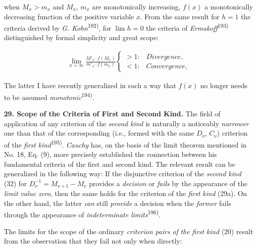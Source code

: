 \thispagestyle{fancy}

\vspace{0.5cm}

when $M_x > m_x$ and $M_x$, $m_x$ are monotonically increasing, $f(x)$ a monotonically decreasing function of the positive variable $x$. From the same result for $h = 1$ the criteria derived by \textit{G. Kohn}\textsuperscript{192)}, for $\lim h = 0$ the criteria of \textit{Ermakoff}\textsuperscript{193)} distinguished by formal simplicity and great scope:

\vspace{-0.5cm}
\begin{align}
    \lim_{x=\infty} \frac{M'_x \cdot f(M_x)}{m'_x \cdot f(m_x)} \begin{cases} > 1: & \textit{Divergence}, \\ < 1: & \textit{Convergence}, \end{cases}
\end{align}
\vspace{-0.3cm}

The latter I have recently generalized in such a way that $f(x)$ no longer needs to be assumed \textit{monotonic}\textsuperscript{194)}.

\vspace{0.2cm}
\textbf{29. Scope of the Criteria of First and Second Kind.} The field of application of any criterion of the \textit{second kind} is naturally a noticeably \textit{narrower} one than that of the corresponding (i.e., formed with the same $D_\nu$, $C_\nu$) criterion of the \textit{first kind}\textsuperscript{195)}. \textit{Cauchy} has, on the basis of the limit theorem mentioned in No. 18, Eq. (9), more precisely established the connection between his fundamental criteria of the first and second kind. The relevant result can be generalized in the following way: If the disjunctive criterion of the \textit{second kind} (32) for $D_{\nu}^{-1} = M_{\nu+1} - M_\nu$ provides a \textit{decision} or \textit{fails} by the appearance of the \textit{limit value zero}, then the same holds for the criterion of the \textit{first kind} (29a). On the other hand, the latter \textit{can} still \textit{provide} a decision when the \textit{former} fails through the appearance of \textit{indeterminate limits}\textsuperscript{196)}.

The limits for the scope of the ordinary \textit{criterion pairs of the first kind} (20) result from the observation that they fail not only when directly:


